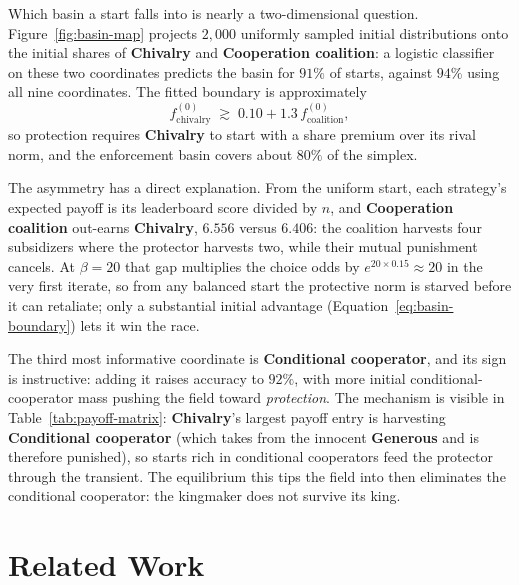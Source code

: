 \documentclass[11pt]{article}
\begin{document}
Which basin a start falls into is nearly a two-dimensional question.
Figure~\ref{fig:basin-map} projects $2{,}000$ uniformly sampled
initial distributions onto the initial shares of \textbf{Chivalry}
and \textbf{Cooperation coalition}: a logistic classifier on these
two coordinates predicts the basin for $91\%$ of starts, against
$94\%$ using all nine coordinates.
The fitted boundary is approximately
\begin{equation}
  f^{(0)}_{\text{chivalry}}
  \;\gtrsim\; 0.10
  + 1.3\, f^{(0)}_{\text{coalition}},
  \label{eq:basin-boundary}
\end{equation}
so protection requires \textbf{Chivalry} to start with a share
premium over its rival norm, and the enforcement basin covers about
$80\%$ of the simplex.

The asymmetry has a direct explanation.
From the uniform start, each strategy's expected payoff is its
leaderboard score divided by $n$, and \textbf{Cooperation coalition}
out-earns \textbf{Chivalry}, $6.556$ versus $6.406$: the coalition
harvests four subsidizers where the protector harvests two, while
their mutual punishment cancels.
At $\beta = 20$ that gap multiplies the choice odds by
$e^{20 \times 0.15} \approx 20$ in the very first iterate, so from
any balanced start the protective norm is starved before it can
retaliate; only a substantial initial advantage
(Equation~\eqref{eq:basin-boundary}) lets it win the race.

The third most informative coordinate is \textbf{Conditional
cooperator}, and its sign is instructive: adding it raises accuracy
to $92\%$, with more initial conditional-cooperator mass pushing the
field toward \emph{protection}.
The mechanism is visible in Table~\ref{tab:payoff-matrix}:
\textbf{Chivalry}'s largest payoff entry is harvesting
\textbf{Conditional cooperator} (which takes from the innocent
\textbf{Generous} and is therefore punished), so starts rich in
conditional cooperators feed the protector through the transient.
The equilibrium this tips the field into then eliminates the
conditional cooperator: the kingmaker does not survive its king.








\section{Related Work}
\label{sec:related}
\end{document}
